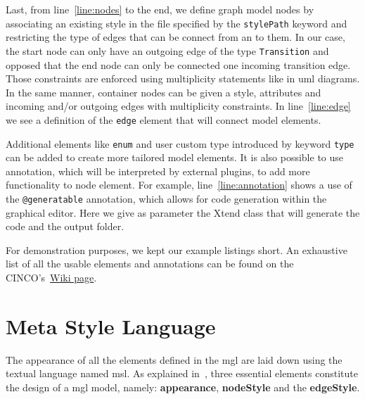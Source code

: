 Last, from line~\ref{line:nodes} to the end, we define graph model nodes by associating an existing style in the file specified by the \lstinline[language=MGL]{stylePath} keyword and restricting the type of edges that can be connect from an to them. In our case, the start node can only have an outgoing edge of the type \lstinline[language=MGL]{Transition} and opposed that the end node can only be connected one incoming transition edge. Those constraints are enforced using multiplicity statements like in \acrfull{uml} diagrams. In the same manner, container nodes can be given a style, attributes and incoming and/or outgoing edges with multiplicity constraints. In line~\ref{line:edge} we see a definition of the \lstinline[language=MGL]{edge} element that will connect model elements.

Additional elements like \lstinline[language=MGL]{enum} and user custom type introduced by keyword \lstinline[language=MGL]{type} can be added to create more tailored model elements. It is also possible to use annotation, which will be interpreted by external plugins, to add more functionality to node element. For example, line~\ref{line:annotation} shows a use of the \lstinline[language=MGL]{@generatable} annotation, which allows for code generation within the graphical editor. Here we give as parameter the Xtend class that will generate the code and the output folder.

For demonstration purposes, we kept our example listings short. An exhaustive list of all the usable elements and annotations can be found on the CINCO's~\href{https://gitlab.com/scce/cinco/-/wikis/Cinco-Product-Specification}{Wiki page}.

\section{Meta Style Language}\label{sec:MSL}
The appearance of all the elements defined in the \acrshort{mgl} are laid down using the textual language named \acrfull{msl}. As explained in~\cite{gitlabcinco}, three essential elements constitute the design of a \acrshort{mgl} model, namely: \textbf{appearance}, \textbf{nodeStyle} and the \textbf{edgeStyle}.

